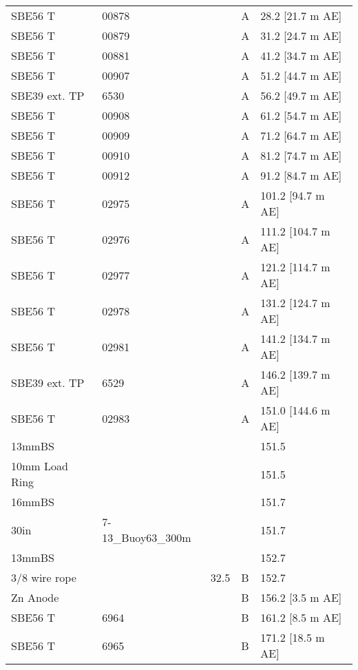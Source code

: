 \documentclass{article}
\begin{document}
\begin{table}[!htbp]
\begin{tabular}{lllll}
SBE56 T & 00878 &  & A & 28.2 [21.7 m AE] \\
SBE56 T & 00879 &  & A & 31.2 [24.7 m AE] \\
SBE56 T & 00881 &  & A & 41.2 [34.7 m AE] \\
SBE56 T & 00907 &  & A & 51.2 [44.7 m AE] \\
SBE39 ext. TP & 6530 &  & A & 56.2 [49.7 m AE] \\
SBE56 T & 00908 &  & A & 61.2 [54.7 m AE] \\
SBE56 T & 00909 &  & A & 71.2 [64.7 m AE] \\
SBE56 T & 00910 &  & A & 81.2 [74.7 m AE] \\
SBE56 T & 00912 &  & A & 91.2 [84.7 m AE] \\
SBE56 T & 02975 &  & A & 101.2 [94.7 m AE] \\
SBE56 T & 02976 &  & A & 111.2 [104.7 m AE] \\
SBE56 T & 02977 &  & A & 121.2 [114.7 m AE] \\
SBE56 T & 02978 &  & A & 131.2 [124.7 m AE] \\
SBE56 T & 02981 &  & A & 141.2 [134.7 m AE] \\
SBE39 ext. TP & 6529 &  & A & 146.2 [139.7 m AE] \\
SBE56 T & 02983 &  & A & 151.0 [144.6 m AE] \\
13mmBS &  &  &  & 151.5 \\
10mm Load Ring &  &  &  & 151.5 \\
16mmBS &  &  &  & 151.7 \\
30in & 7-13\_Buoy63\_300m &  &  & 151.7 \\
13mmBS &  &  &  & 152.7 \\
3/8 wire rope &  & 32.5 & B & 152.7 \\
Zn Anode &  &  & B & 156.2 [3.5 m AE] \\
SBE56 T & 6964 &  & B & 161.2 [8.5 m AE] \\
SBE56 T & 6965 &  & B & 171.2 [18.5 m AE] \\
\bottomrule
\end{tabular}
\end{table}
\end{document}
